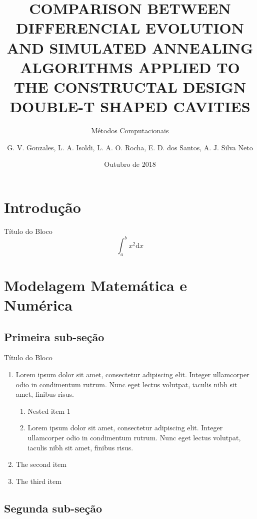 \documentclass[xcolor=dvipsnames,10pt]{beamer}
\title{\textsc{\footnotesize COMPARISON BETWEEN DIFFERENCIAL EVOLUTION AND SIMULATED ANNEALING ALGORITHMS APPLIED TO THE CONSTRUCTAL DESIGN DOUBLE-T SHAPED CAVITIES
}}
\author{\footnotesize G. V. Gonzales,  L. A. Isoldi, L. A. O. Rocha, E. D. dos Santos, A. J. Silva Neto}
\institute{\scriptsize Programa de Pós-Graduação em Modelagem Computacional - FURG}
\subtitle{\scriptsize Métodos Computacionais}
\date{\scriptsize Outubro de 2018}
\begin{document}
\frame{\titlepage}
\frame{\tableofcontents}

\section{Introdução}

\begin{frame}

\begin{block}{Título do Bloco}
\begin{equation}
\int_{a}^{b} x^2  \mathrm{d} x
\end{equation}
\end{block}

\end{frame}

\section{Modelagem Matemática e Numérica}

\subsection{Primeira sub-seção}

\begin{frame}
\begin{block}{Título do Bloco}
\begin{enumerate}
\item Lorem ipsum dolor sit amet, consectetur adipiscing elit. Integer ullamcorper odio in condimentum rutrum. Nunc eget lectus volutpat, iaculis nibh sit amet, finibus risus.
\begin{enumerate}
\item Nested item 1
\item Lorem ipsum dolor sit amet, consectetur adipiscing elit. Integer ullamcorper odio in condimentum rutrum. Nunc eget lectus volutpat, iaculis nibh sit amet, finibus risus.
\end{enumerate}
\item The second item
\item The third item
\end{enumerate}
\end{block}
\end{frame}

\subsection{Segunda sub-seção}
\end{document}
